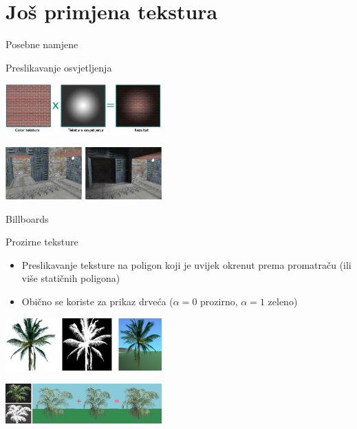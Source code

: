 \documentclass[9pt]{beamer}
\begin{document}
\section{Još primjena tekstura}
\begin{frame}{Posebne namjene}
	\begin{block}{Preslikavanje osvjetljenja}
		\begin{center}
			\includegraphics[width=6cm]{slike/teksture_light.png}
		\end{center}
		\begin{center}
			\includegraphics[width=6cm]{slike/teksture_light_02.png}
		\end{center}
	\end{block}
\end{frame}
%
\begin{frame}{Billboards}
	\begin{block}{Prozirne teksture}
		\begin{itemize}
			\item Preslikavanje teksture na poligon koji je uvijek okrenut prema promatraču (ili više
			statičnih poligona)
			\item Obično se koriste za prikaz drveća ($\alpha=0$ prozirno, $\alpha=1$ zeleno)
		\end{itemize}
	\end{block}
	\begin{center}
		\includegraphics[width=6cm]{slike/teksture_billboards_01.png}
	\end{center}
	\begin{center}
		\includegraphics[width=6cm]{slike/teksture_billboards_02.png}
	\end{center}
\end{frame}
\end{document}
